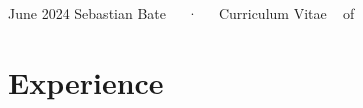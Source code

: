 \documentclass[11pt,a4paper,]{awesome-cv}
\begin{document}
\makecvheader

\makecvfooter
  {June 2024}
    {Sebastian Bate~~~·~~~Curriculum Vitae}
  {\thepage~ of \pageref{LastPage}~}





\hypertarget{experience}{%
\section{Experience}\label{experience}}
\end{document}
